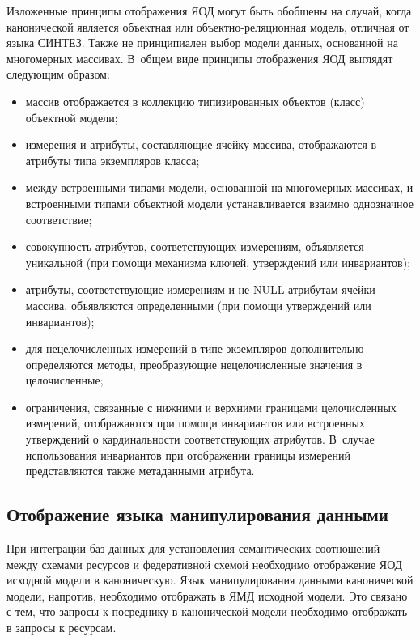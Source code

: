 \begin{multicols}{2}
        Изложенные принципы отображения ЯОД могут быть обобщены на 
случай, когда канонической является объектная или 
        объ\-ект\-но-ре\-ля\-ци\-он\-ная модель, отличная от языка СИНТЕЗ. 
Также не принципиален выбор модели данных, основанной на многомерных 
массивах. В~общем виде принципы отображения ЯОД выглядят следующим 
образом:
        \begin{itemize}
\item массив отображается в коллекцию типизированных объектов (класс) 
объектной модели;
\item измерения и атрибуты, составляющие ячейку массива, отображаются в 
атрибуты типа экземпляров класса;
\item между встроенными типами модели, основанной на многомерных 
массивах, и встроенными типами объектной модели устанавливается 
взаимно однозначное соответствие;
\item совокупность атрибутов, соответствующих измерениям, объявляется 
уникальной (при помощи механизма ключей, утверждений или 
инвариантов);
\item атрибуты, соответствующие измерениям и не-{\sf NULL} атрибутам ячейки 
массива, объявляются определенными (при помощи утверждений или 
инвариантов);
\item для нецелочисленных измерений в типе экземпляров дополнительно 
определяются методы, преобразующие нецелочисленные значения в 
целочисленные;
\item ограничения, связанные с нижними и верхними границами 
целочисленных измерений, отображаются при помощи инвариантов или 
встроенных утверждений о кардинальности соответствующих атрибутов. 
В~случае использования инвариантов при отображении границы измерений 
представляются также метаданными атрибута.
\end{itemize}

\subsection{Отображение языка манипулирования данными}

        При интеграции баз данных для установления семантических 
соотношений между схемами ресурсов и федеративной схемой необходимо 
отображение ЯОД исходной модели в каноническую. Язык манипулирования данными канонической 
модели, напротив, необходимо отображать в ЯМД исходной модели. Это 
связано с тем, что запросы к посреднику в канонической модели необходимо 
отображать в запросы к ресурсам.
        

\end{multicols}
